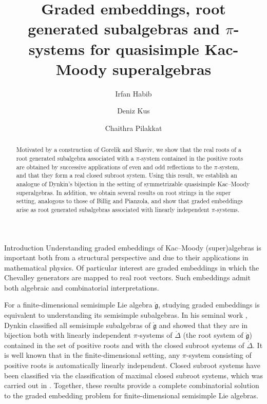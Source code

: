 \documentclass[11pt,reqno]{amsart}
\title[Root generated subalgebras and $\pi$-systems]{Graded embeddings, root generated subalgebras and $\pi$-systems for quasisimple Kac-Moody superalgebras}
\author{Irfan Habib}
\author{Deniz Kus}
\author{Chaithra Pilakkat}
\makeatletter
\theoremstyle{plain}
\theoremstyle{definition}
\theoremstyle{remark}
\newcommand{\lie}[1]{\mathfrak{#1}}
\numberwithin{equation}{section}
\def\section{\def\@secnumfont{\mdseries}\@startsection{section}{1}%
  \z@{.7\linespacing\@plus\linespacing}{.5\linespacing}%
  {\normalfont\scshape\centering}}
\makeatother
\begin{document}
\begin{abstract}
Motivated by a construction of Gorelik and Shaviv, we show that the real roots of a root generated subalgebra associated with a $\pi$-system contained in the positive roots are obtained by successive applications of even and odd reflections to the $\pi$-system, and that they form a real closed subroot system. Using this result, we establish an analogue of Dynkin’s bijection in the setting of symmetrizable quasisimple Kac–Moody superalgebras. In addition, we obtain several results on root strings in the super setting, analogous to those of Billig and Pianzola, and show that graded embeddings arise as root generated subalgebras associated with linearly independent $\pi$-systems.
\end{abstract}
\maketitle

\section{Introduction}
Understanding graded embeddings of Kac–Moody (super)algebras is important both from a structural perspective and due to their applications in mathematical physics. Of particular interest are graded embeddings in which the Chevalley generators are mapped to real root vectors. Such embeddings admit both algebraic and combinatorial interpretations.

For a finite-dimensional semisimple Lie algebra $\mathring{\lie g}$, studying graded embeddings is equivalent to understanding its semisimple subalgebras. In his seminal work \cite{dynkin52semisimple}, Dynkin classified all semisimple subalgebras of $\mathring{\lie g}$ and showed that they are in bijection both with linearly independent $\pi$-systems of $\mathring{\Delta}$ (the root system of $\mathring{\lie g}$) contained in the set of positive roots and with the closed subroot systems of $\mathring{\Delta}$. It is well known that in the finite-dimensional setting, any $\pi$-system consisting of positive roots is automatically linearly independent. Closed subroot systems have been classified via the classification of maximal closed subroot systems, which was carried out in \cite{BorelDeS}. Together, these results provide a complete combinatorial solution to the graded embedding problem for finite-dimensional semisimple Lie algebras.
\end{document}
